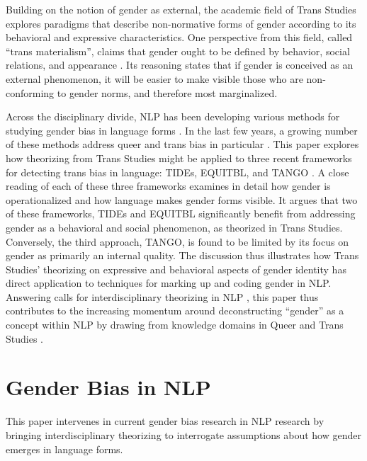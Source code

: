 \documentclass[11pt]{article}
\begin{document}
Building on the notion of gender as external, the academic field of Trans Studies explores paradigms that describe non-normative forms of gender according to its behavioral and expressive characteristics. One perspective from this field, called “trans materialism”, claims that gender ought to be defined by behavior, social relations, and appearance \citep{amin:2022}. Its reasoning states that if gender is conceived as an external phenomenon, it will be easier to make visible those who are non-conforming to gender norms, and therefore most marginalized.

Across the disciplinary divide, NLP has been developing various methods for studying gender bias in language forms \citep{bolukbasi:2016,rudinger:2018,guo:2021,kaneko:2024}. In the last few years, a growing number of these methods address queer and trans bias in particular \citep{felkner:2023,ovalle:2023,lameiro:2025,devinney:2024}. This paper explores how theorizing from Trans Studies might be applied to three recent frameworks for detecting trans bias in language: TIDEs, EQUITBL, and TANGO \citep{lameiro:2025,devinney:2024,ovalle:2023}. A close reading of each of these three frameworks examines in detail how gender is operationalized and how language makes gender forms visible. It argues that two of these frameworks, TIDEs and EQUITBL significantly benefit from addressing gender as a behavioral and social phenomenon, as theorized in Trans Studies. Conversely, the third approach, TANGO, is found to be limited by its focus on gender as primarily an internal quality. The discussion thus illustrates how Trans Studies’ theorizing on expressive and behavioral aspects of gender identity has direct application to techniques for marking up and coding gender in NLP. Answering calls for interdisciplinary theorizing in NLP \citep{wang:2025,birhane:2022}, this paper thus contributes to the increasing momentum around deconstructing “gender” as a concept within NLP by drawing from knowledge domains in Queer and Trans Studies \citep{hafner:2025,calado:2025}.

\section{Gender Bias in NLP}
This paper intervenes in current gender bias research in NLP research by bringing interdisciplinary theorizing to interrogate assumptions about how gender emerges in language forms.
\end{document}
